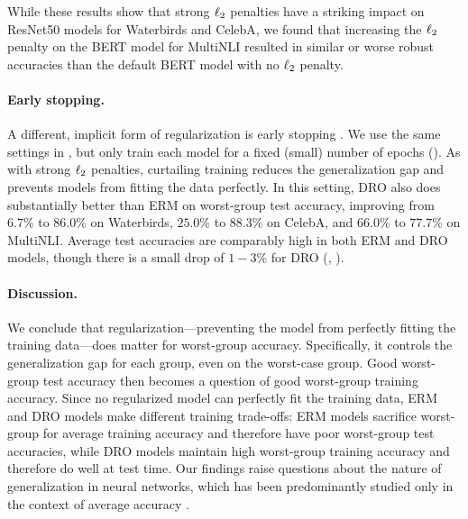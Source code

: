 While these results show that strong $\ell_2$ penalties have a striking impact on ResNet50 models for Waterbirds and CelebA,
we found that increasing the $\ell_2$ penalty on the BERT model for MultiNLI resulted in similar or worse robust accuracies than the default BERT model with no $\ell_2$ penalty.

\paragraph{Early stopping.}
A different, implicit form of regularization is early stopping \citep{hardt2016train}.
We use the same settings in ,
but only train each model for a fixed (small) number of epochs ().
As with strong $\ell_2$ penalties, curtailing training reduces the generalization gap
and prevents models from fitting the data perfectly.
In this setting, DRO also does substantially better than ERM
on worst-group test accuracy,
improving from
$6.7\%$ to $86.0\%$ on Waterbirds,
$25.0\%$ to $88.3\%$ on CelebA,
and $66.0\%$ to $77.7\%$ on MultiNLI.
Average test accuracies are comparably high in both ERM and DRO models,
though there is a small drop of $1-3\%$ for DRO (, ).

\paragraph{Discussion.}
We conclude that regularization---preventing the model from perfectly fitting the training data---does matter for worst-group accuracy.
Specifically, it controls the generalization gap for each group, even on the worst-case group. Good worst-group test accuracy then becomes a question of good worst-group training accuracy.
Since no regularized model can perfectly fit the training data, ERM and DRO models make different training trade-offs:
ERM models sacrifice worst-group for average training accuracy and therefore have poor worst-group test accuracies,
while DRO models maintain high worst-group training accuracy and therefore do well at test time.
Our findings raise questions about the nature of generalization in neural networks,
which has been predominantly studied only in the context of average accuracy \citep{zhang2017understanding, hoffer2017train}.
